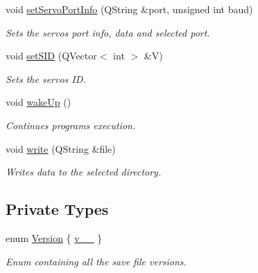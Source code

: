 \begin{DoxyCompactItemize}
void \hyperlink{a00007_a76af3e89d1a8705426584bedb0624909}{set\+Servo\+Port\+Info} (Q\+String \&port, unsigned int baud)
\begin{DoxyCompactList}\small\item\em Sets the servos port info, data and selected port. \end{DoxyCompactList}\item 
void \hyperlink{a00007_ac3471e5020f5d9babd3f2ff7b3b82aca}{set\+S\+I\+D} (Q\+Vector$<$ int $>$ \&V)
\begin{DoxyCompactList}\small\item\em Sets the servos I\+D. \end{DoxyCompactList}\item 
void \hyperlink{a00007_a5f32574f843d76deffec45995028389b}{wake\+Up} ()
\begin{DoxyCompactList}\small\item\em Continues program\textquotesingle{}s execution. \end{DoxyCompactList}\item 
void \hyperlink{a00007_ae5753b8c12768d2115ff900f0ab8e13c}{write} (Q\+String \&file)
\begin{DoxyCompactList}\small\item\em Writes data to the selected directory. \end{DoxyCompactList}\end{DoxyCompactItemize}
\subsection*{Private Types}
\begin{DoxyCompactItemize}
\item 
enum \hyperlink{a00007_aeccce0ac6a969e2ee7cbe91687e2d085}{Version} \{ \hyperlink{a00007_aeccce0ac6a969e2ee7cbe91687e2d085a319b6bf2cb120faeefbd0a5118ece7e3}{v\+\_\+\_}
 \}
\begin{DoxyCompactList}\small\item\em Enum containing all the save file versions. \end{DoxyCompactList}\end{DoxyCompactItemize}
